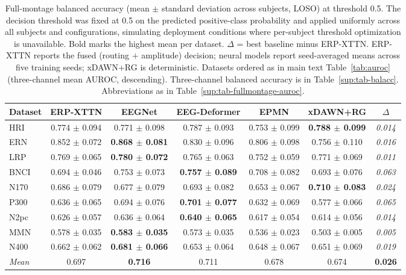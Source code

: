 \begin{table}[t]
\centering
\setlength{\tabcolsep}{5pt}
\caption{%
Full-montage balanced accuracy (mean $\pm$ standard deviation across subjects, LOSO) at threshold 0.5. The decision threshold was fixed at 0.5 on the predicted positive-class probability and applied uniformly across all subjects and configurations, simulating deployment conditions where per-subject threshold optimization is unavailable. Bold marks the highest mean per dataset. $\Delta$ = best baseline minus ERP-XTTN. ERP-XTTN reports the fused (routing $+$ amplitude) decision; neural models report seed-averaged means across five training seeds; xDAWN+RG is deterministic. Datasets ordered as in main text Table~\ref{tab:auroc} (three-channel mean AUROC, descending). Three-channel balanced accuracy is in Table~\ref{sup:tab-balacc}. Abbreviations as in Table~\ref{sup:tab-fullmontage-auroc}.%
}
\label{sup:tab-fullmontage-ba}
\begin{tabular}{lcccccc}
\toprule
Dataset & ERP-XTTN & EEGNet & EEG-Deformer & EPMN & xDAWN+RG & $\Delta$ \\
\midrule
HRI & 0.774 $\pm$ 0.094 & 0.771 $\pm$ 0.098 & 0.787 $\pm$ 0.093 & 0.753 $\pm$ 0.099 & \textbf{0.788 $\pm$ 0.099} & \textit{0.014} \\
ERN & 0.852 $\pm$ 0.072 & \textbf{0.868 $\pm$ 0.081} & 0.830 $\pm$ 0.096 & 0.806 $\pm$ 0.098 & 0.756 $\pm$ 0.110 & \textit{0.016} \\
LRP & 0.769 $\pm$ 0.065 & \textbf{0.780 $\pm$ 0.072} & 0.765 $\pm$ 0.063 & 0.752 $\pm$ 0.059 & 0.771 $\pm$ 0.069 & \textit{0.011} \\
BNCI & 0.694 $\pm$ 0.046 & 0.753 $\pm$ 0.073 & \textbf{0.757 $\pm$ 0.089} & 0.708 $\pm$ 0.082 & 0.693 $\pm$ 0.076 & \textit{0.063} \\
N170 & 0.686 $\pm$ 0.079 & 0.677 $\pm$ 0.079 & 0.693 $\pm$ 0.082 & 0.653 $\pm$ 0.067 & \textbf{0.710 $\pm$ 0.083} & \textit{0.024} \\
P300 & 0.636 $\pm$ 0.065 & 0.694 $\pm$ 0.076 & \textbf{0.701 $\pm$ 0.077} & 0.632 $\pm$ 0.069 & 0.577 $\pm$ 0.066 & \textit{0.065} \\
N2pc & 0.626 $\pm$ 0.057 & 0.636 $\pm$ 0.064 & \textbf{0.640 $\pm$ 0.065} & 0.617 $\pm$ 0.054 & 0.614 $\pm$ 0.056 & \textit{0.014} \\
MMN & 0.578 $\pm$ 0.035 & \textbf{0.583 $\pm$ 0.035} & 0.573 $\pm$ 0.035 & 0.536 $\pm$ 0.023 & 0.503 $\pm$ 0.005 & \textit{0.005} \\
N400 & 0.662 $\pm$ 0.062 & \textbf{0.681 $\pm$ 0.066} & 0.653 $\pm$ 0.064 & 0.648 $\pm$ 0.067 & 0.651 $\pm$ 0.069 & \textit{0.019} \\
\midrule
\textit{Mean} & 0.697 & \textbf{0.716} & 0.711 & 0.678 & 0.674 & \textbf{0.026} \\
\bottomrule
\end{tabular}
\end{table}
